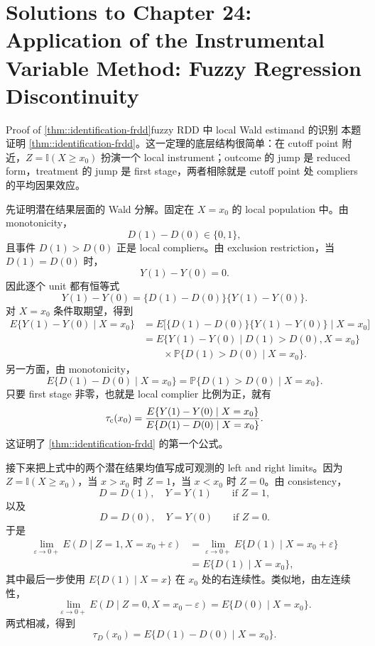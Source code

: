 \chapter{Solutions to Chapter 24: Application of the Instrumental Variable Method: Fuzzy Regression Discontinuity}
\label{sol:chapter24}

\begin{exercisesolution}{Proof of \cref{thm::identification-frdd}}{fuzzy RDD 中 local Wald estimand 的识别}
本题证明 \cref{thm::identification-frdd}。这一定理的底层结构很简单：在 cutoff point 附近，$Z=\mathbb{I}(X\geq x_0)$ 扮演一个 local instrument；outcome 的 jump 是 reduced form，treatment 的 jump 是 first stage，两者相除就是 cutoff point 处 compliers 的平均因果效应。

先证明潜在结果层面的 Wald 分解。固定在 $X=x_0$ 的 local population 中。由 monotonicity，
\[
D(1)-D(0)\in\{0,1\},
\]
且事件 $D(1)>D(0)$ 正是 local compliers。由 exclusion restriction，当 $D(1)=D(0)$ 时，
\[
Y(1)-Y(0)=0.
\]
因此逐个 unit 都有恒等式
\[
Y(1)-Y(0)
=
\{D(1)-D(0)\}\{Y(1)-Y(0)\}.
\]
对 $X=x_0$ 条件取期望，得到
\begin{align*}
E\{Y(1)-Y(0)\mid X=x_0\}
&=
E\bigl[\{D(1)-D(0)\}\{Y(1)-Y(0)\}\mid X=x_0\bigr]\\
&=
E\{Y(1)-Y(0)\mid D(1)>D(0),X=x_0\}\\
&\qquad {}\times
\mathbb{P}\{D(1)>D(0)\mid X=x_0\}.
\end{align*}
另一方面，由 monotonicity，
\[
E\{D(1)-D(0)\mid X=x_0\}
=
\mathbb{P}\{D(1)>D(0)\mid X=x_0\}.
\]
只要 first stage 非零，也就是 local complier 比例为正，就有
\[
\tau_{\textup{c}}(x_0)
=
\frac{E\{Y(1)-Y(0)\mid X=x_0\}}
       {E\{D(1)-D(0)\mid X=x_0\}}.
\]
这证明了 \cref{thm::identification-frdd} 的第一个公式。

接下来把上式中的两个潜在结果均值写成可观测的 left and right limits。因为 $Z=\mathbb{I}(X\geq x_0)$，当 $x>x_0$ 时 $Z=1$，当 $x<x_0$ 时 $Z=0$。由 consistency，
\[
D=D(1),\quad Y=Y(1)\qquad \text{if } Z=1,
\]
以及
\[
D=D(0),\quad Y=Y(0)\qquad \text{if } Z=0.
\]
于是
\begin{align*}
\lim_{\varepsilon\to 0+}E(D\mid Z=1,X=x_0+\varepsilon)
&=
\lim_{\varepsilon\to 0+}E\{D(1)\mid X=x_0+\varepsilon\}\\
&=
E\{D(1)\mid X=x_0\},
\end{align*}
其中最后一步使用 $E\{D(1)\mid X=x\}$ 在 $x_0$ 处的右连续性。类似地，由左连续性，
\[
\lim_{\varepsilon\to 0+}E(D\mid Z=0,X=x_0-\varepsilon)
=
E\{D(0)\mid X=x_0\}.
\]
两式相减，得到
\[
\tau_D(x_0)
=
E\{D(1)-D(0)\mid X=x_0\}.
\]


\end{exercisesolution}
